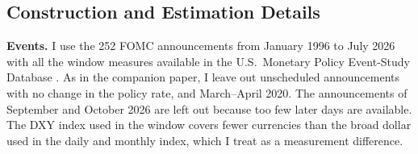 \documentclass[11pt]{article}
\begin{document}
\begin{appendices}

\FloatBarrier

\FloatBarrier

\FloatBarrier

\FloatBarrier

\FloatBarrier

\FloatBarrier

\FloatBarrier

\FloatBarrier

\FloatBarrier

\FloatBarrier

\FloatBarrier

\FloatBarrier

\FloatBarrier

\FloatBarrier

\FloatBarrier

\FloatBarrier

\FloatBarrier

\FloatBarrier

\FloatBarrier

\FloatBarrier


\FloatBarrier

\FloatBarrier

\FloatBarrier

\FloatBarrier

\FloatBarrier

\FloatBarrier
\FloatBarrier
\section{Construction and Estimation Details}\label{app:details}
\textbf{Events.} I use the 252 FOMC announcements from January 1996 to July 2026 with all the window measures available in the U.S.\ Monetary Policy Event-Study Database \citep{acosta2025}. As in the companion paper, I leave out unscheduled announcements with no change in the policy rate, and March--April 2020. The announcements of September and October 2026 are left out because too few later days are available. The DXY index used in the window covers fewer currencies than the broad dollar used in the daily and monthly index, which I treat as a measurement difference.


\end{appendices}
\end{document}

